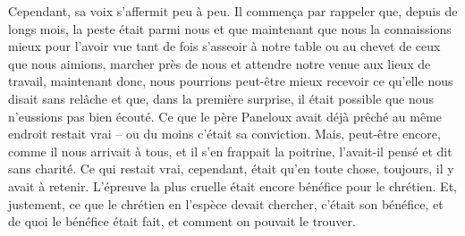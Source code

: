 \documentclass[french,twoside]{book} %
\begin{document}
Cependant, sa voix s’affermit peu à peu. Il commença par rappeler que, depuis de longs mois, la peste était parmi nous et que maintenant que nous la connaissions mieux pour l’avoir vue tant de fois s’asseoir à notre table ou au chevet de ceux que nous aimions, marcher près de nous et attendre notre venue aux lieux de travail, maintenant donc, nous pourrions peut-être mieux recevoir ce qu’elle nous disait sans relâche et que, dans la première surprise, il était possible que nous n’eussions pas bien écouté. Ce que le père Paneloux avait déjà prêché au même endroit restait vrai – ou du moins c’était sa conviction. Mais, peut-être encore, comme il nous arrivait à tous, et il s’en frappait la poitrine, l’avait-il pensé et dit sans charité. Ce qui restait vrai, cependant, était qu’en toute chose, toujours, il y avait à retenir. L’épreuve la plus cruelle était encore bénéfice pour le chrétien. Et, justement, ce que le chrétien en l’espèce devait chercher, c’était son bénéfice, et de quoi le bénéfice était fait, et comment on pouvait le trouver.\par
\end{document}
